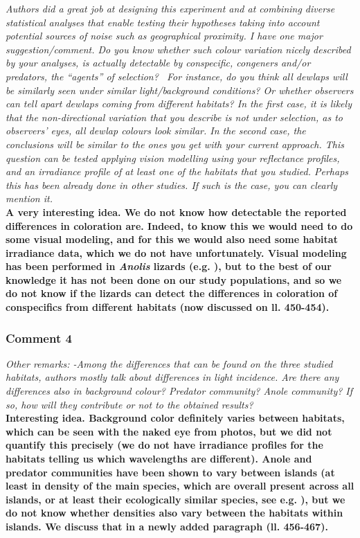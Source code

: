 \documentclass{article}
\begin{document}
	\textit{Authors did a great job at designing this experiment and at combining diverse statistical analyses that enable testing their hypotheses taking into account potential sources of noise such as geographical proximity. I have one major suggestion/comment. Do you know whether such colour variation nicely described by your analyses, is actually detectable by conspecific, congeners and/or predators, the “agents” of selection?  For instance, do you think all dewlaps will be similarly seen under similar light/background conditions? Or whether observers can tell apart dewlaps coming from different habitats? In the first case, it is likely that the non-directional variation that you describe is not under selection, as to observers’ eyes, all dewlap colours look similar. In the second case, the conclusions will be similar to the ones you get with your current approach. This question can be tested applying vision modelling using your reflectance profiles, and an irradiance profile of at least one of the habitats that you studied. Perhaps this has been already done in other studies. If such is the case, you can clearly mention it.}\\
	
	\textbf{A very interesting idea. We do not know how detectable the reported differences in coloration are. Indeed, to know this we would need to do some visual modeling, and for this we would also need some habitat irradiance data, which we do not have unfortunately. Visual modeling has been performed in \textit{Anolis} lizards (e.g. \citealt{Leal2004, Fleishman2020}), but to the best of our knowledge it has not been done on our study populations, and so we do not know if the lizards can detect the differences in coloration of conspecifics from different habitats (now discussed on ll. 450-454).}
	
	\subsubsection*{Comment 4}
	
	\textit{Other remarks:
	-Among the differences that can be found on the three studied habitats, authors mostly talk about differences in light incidence. Are there any differences also in background colour? Predator community? Anole community? If so, how will they contribute or not to the obtained results?}\\
	
	\textbf{Interesting idea. Background color definitely varies between habitats, which can be seen with the naked eye from photos, but we did not quantify this precisely (we do not have irradiance profiles for the habitats telling us which wavelengths are different). Anole and predator communities have been shown to vary between islands (at least in density of the main species, which are overall present across all islands, or at least their ecologically similar species, see e.g. \citealt{Baeckens2018}), but we do not know whether densities also vary between the habitats within islands. We discuss that in a newly added paragraph (ll. 456-467).}
	
\end{document}
